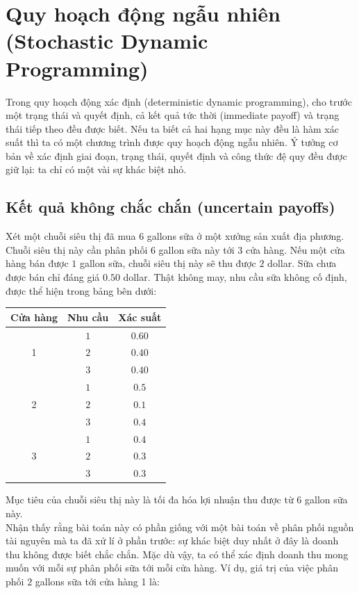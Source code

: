 \documentclass[12pt,a4paper]{article}
\begin{document}
\section{Quy hoạch động ngẫu nhiên (Stochastic Dynamic Programming)}
Trong quy hoạch động xác định (deterministic dynamic programming), cho trước một trạng thái và quyết định, cả kết quả tức thời (immediate payoff) và trạng thái tiếp theo đều được biết. Nếu ta biết cả hai hạng mục này đều là hàm xác suất thì ta có một chương trình được quy hoạch động ngẫu nhiên. Ý tưởng cơ bản về xác định giai đoạn, trạng thái, quyết định và công thức đệ quy đều được giữ lại: ta chỉ có một vài sự khác biệt nhỏ.
\subsection{Kết quả không chắc chắn (uncertain payoffs)}
Xét một chuỗi siêu thị đã mua \(6\) gallons sữa ở một xưởng sản xuất địa phương. Chuỗi siêu thị này cần phân phối \(6\) gallon sữa này tới \(3\) cửa hàng. Nếu một cửa hàng bán được \(1\) gallon sữa, chuỗi siêu thị này sẽ thu được \(2\) dollar. Sữa chưa được bán chỉ đáng giá \(0.50\) dollar. Thật không may, nhu cầu sữa không cố định, được thể hiện trong bảng bên dưới:
\begin{center}
\begin{table}[H]
\begin{tabular}{|c|c|c|}
\hline 
Cửa hàng & Nhu cầu & Xác suất \\ 
\hline 
\multirow{3}{*}{1} & \(1\) & \(0.60\) \\ 
 & \(2\) & \(0.40\) \\ 
 & \(3\) & \(0.40\) \\ 
 \hline
\multirow{3}{*}{2} & \(1\) & \(0.5\) \\ 
 & \(2\) & \(0.1\) \\ 
 & \(3\) & \(0.4\) \\ 
\hline 
\multirow{3}{*}{3} & \(1\) & \(0.4\) \\  
 & \(2\) & \(0.3\) \\ 
 & \(3\) & \(0.3\) \\ 
\hline 
\end{tabular} 
\end{table}
\end{center}
Mục tiêu của chuỗi siêu thị này là tối đa hóa lợi nhuận thu được từ \(6\) gallon sữa này. \\
Nhận thấy rằng bài toán này có phần giống với một bài toán về phân phối nguồn tài nguyên mà ta đã xử lí ở phần trước: sự khác biệt duy nhất ở đây là doanh thu không được biết chắc chắn. Mặc dù vậy, ta có thể xác định doanh thu mong muốn với mỗi sự phân phối sữa tới mỗi cửa hàng. Ví dụ, giá trị của việc phân phối \(2\) gallons sữa tới cửa hàng 1 là:
\end{document}
